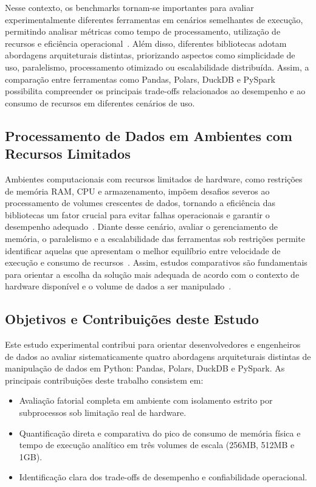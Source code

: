 \documentclass[12pt]{article}
\begin{document}
Nesse contexto, os benchmarks tornam-se importantes para avaliar experimentalmente diferentes
ferramentas em cenários semelhantes de execução, permitindo analisar métricas como tempo de
processamento, utilização de recursos e eficiência operacional~\cite{cirillo:2025}. Além disso,
diferentes bibliotecas adotam abordagens arquiteturais distintas, priorizando aspectos como
simplicidade de uso, paralelismo, processamento otimizado ou escalabilidade distribuída. Assim, a
comparação entre ferramentas como Pandas, Polars, DuckDB e PySpark possibilita compreender os
principais trade-offs relacionados ao desempenho e ao consumo de recursos em diferentes cenários de
uso.

\subsection{Processamento de Dados em Ambientes com Recursos Limitados}

Ambientes computacionais com recursos limitados de hardware, como restrições de memória RAM, CPU e
armazenamento, impõem desafios severos ao processamento de volumes crescentes de dados, tornando a
eficiência das bibliotecas um fator crucial para evitar falhas operacionais e garantir o desempenho
adequado~\cite{ourique:2024}. Diante desse cenário, avaliar o gerenciamento de memória, o
paralelismo e a escalabilidade das ferramentas sob restrições permite identificar aquelas que
apresentam o melhor equilíbrio entre velocidade de execução e consumo de
recursos~\cite{cirillo:2025}. Assim, estudos comparativos são fundamentais para orientar a escolha
da solução mais adequada de acordo com o contexto de hardware disponível e o volume de dados a ser
manipulado~\cite{cirillo:2025}.


\subsection{Objetivos e Contribuições deste Estudo}

Este estudo experimental contribui para orientar desenvolvedores e engenheiros de dados ao avaliar
sistematicamente quatro abordagens arquiteturais distintas de manipulação de dados em Python:
Pandas, Polars, DuckDB e PySpark. As principais contribuições deste trabalho consistem em:

\begin{itemize}
    \item Avaliação fatorial completa em ambiente com isolamento estrito por subprocessos sob limitação real de hardware.
    \item Quantificação direta e comparativa do pico de consumo de memória física e tempo de execução analítico em três volumes de escala (256MB, 512MB e 1GB).
    \item Identificação clara dos trade-offs de desempenho e confiabilidade operacional.
\end{itemize}
\end{document}
